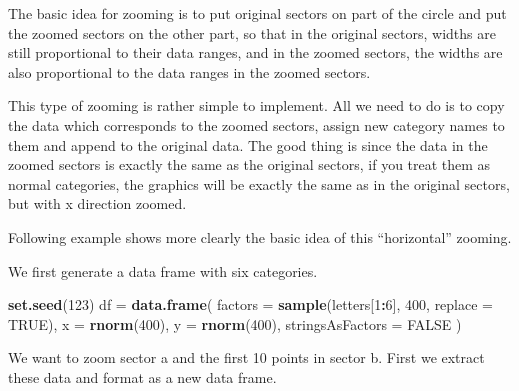 \documentclass[]{book}
\newenvironment{Shaded}{\begin{snugshade}}{\end{snugshade}}
\newcommand{\KeywordTok}[1]{\textcolor[rgb]{0.13,0.29,0.53}{\textbf{#1}}}
\newcommand{\DataTypeTok}[1]{\textcolor[rgb]{0.13,0.29,0.53}{#1}}
\newcommand{\DecValTok}[1]{\textcolor[rgb]{0.00,0.00,0.81}{#1}}
\newcommand{\StringTok}[1]{\textcolor[rgb]{0.31,0.60,0.02}{#1}}
\newcommand{\OtherTok}[1]{\textcolor[rgb]{0.56,0.35,0.01}{#1}}
\newcommand{\OperatorTok}[1]{\textcolor[rgb]{0.81,0.36,0.00}{\textbf{#1}}}
\newcommand{\NormalTok}[1]{#1}
\theoremstyle{definition}
\theoremstyle{definition}
\theoremstyle{remark}
\begin{document}
The basic idea for zooming is to put original sectors on part of the
circle and put the zoomed sectors on the other part, so that in the
original sectors, widths are still proportional to their data ranges,
and in the zoomed sectors, the widths are also proportional to the data
ranges in the zoomed sectors.

This type of zooming is rather simple to implement. All we need to do is
to copy the data which corresponds to the zoomed sectors, assign new
category names to them and append to the original data. The good thing
is since the data in the zoomed sectors is exactly the same as the
original sectors, if you treat them as normal categories, the graphics
will be exactly the same as in the original sectors, but with x
direction zoomed.

Following example shows more clearly the basic idea of this
``horizontal'' zooming.

We first generate a data frame with six categories.

\begin{Shaded}
\begin{Highlighting}[]
\KeywordTok{set.seed}\NormalTok{(}\DecValTok{123}\NormalTok{)}
\NormalTok{df =}\StringTok{ }\KeywordTok{data.frame}\NormalTok{(}
    \DataTypeTok{factors =} \KeywordTok{sample}\NormalTok{(letters[}\DecValTok{1}\OperatorTok{:}\DecValTok{6}\NormalTok{], }\DecValTok{400}\NormalTok{, }\DataTypeTok{replace =} \OtherTok{TRUE}\NormalTok{),}
    \DataTypeTok{x =} \KeywordTok{rnorm}\NormalTok{(}\DecValTok{400}\NormalTok{),}
    \DataTypeTok{y =} \KeywordTok{rnorm}\NormalTok{(}\DecValTok{400}\NormalTok{),}
    \DataTypeTok{stringsAsFactors =} \OtherTok{FALSE}
\NormalTok{)}
\end{Highlighting}
\end{Shaded}

We want to zoom sector a and the first 10 points in sector b. First we
extract these data and format as a new data frame.

\begin{Shaded}
\end{Shaded}
\end{document}
